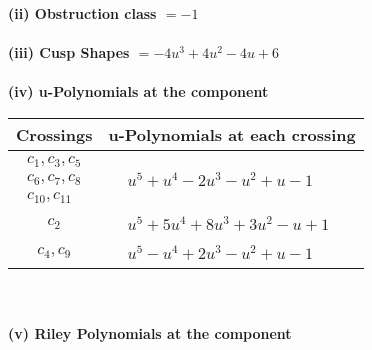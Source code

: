 \documentclass[1p]{elsarticle_modified}
\theoremstyle{definition}
\begin{document}
\flushleft \textbf{(ii) Obstruction class $= -1$}\\~\\
\flushleft \textbf{(iii) Cusp Shapes $= -4 u^3+4 u^2-4 u+6$}\\~\\
\newpage\renewcommand{\arraystretch}{1}
\flushleft \textbf{(iv) u-Polynomials at the component}\newline \\
\begin{tabular}{m{50pt}|m{274pt}}
Crossings & \hspace{64pt}u-Polynomials at each crossing \\
\hline $$\begin{aligned}c_{1},c_{3},c_{5}\\c_{6},c_{7},c_{8}\\c_{10},c_{11}\end{aligned}$$&$\begin{aligned}
&u^5+u^4-2 u^3- u^2+u-1
\end{aligned}$\\
\hline $$\begin{aligned}c_{2}\end{aligned}$$&$\begin{aligned}
&u^5+5 u^4+8 u^3+3 u^2- u+1
\end{aligned}$\\
\hline $$\begin{aligned}c_{4},c_{9}\end{aligned}$$&$\begin{aligned}
&u^5- u^4+2 u^3- u^2+u-1
\end{aligned}$\\
\hline
\end{tabular}\\~\\
\newpage\renewcommand{\arraystretch}{1}
\flushleft \textbf{(v) Riley Polynomials at the component}\newline \\
\end{document}
